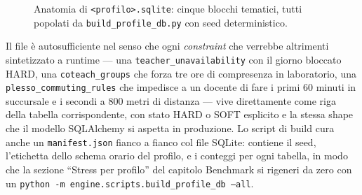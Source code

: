 \begin{figure}[h]
\centering
{}
\caption{Anatomia di \texttt{<profilo>.sqlite}: cinque blocchi
   tematici, tutti popolati da \texttt{build\_profile\_db.py} con
   seed deterministico.}
\label{fig:profilo_sqlite}
\end{figure}

Il file \`e autosufficiente nel senso che ogni \emph{constraint} che
verrebbe altrimenti sintetizzato a runtime --- una \texttt{teacher\_unavailability}
con il giorno bloccato HARD, una \texttt{coteach\_groups} che
forza tre ore di compresenza in laboratorio, una \texttt{plesso\_commuting\_rules}
che impedisce a un docente di fare i primi 60 minuti in succursale
e i secondi a 800 metri di distanza --- vive direttamente come
riga della tabella corrispondente, con stato HARD o SOFT esplicito
e la stessa shape che il modello SQLAlchemy si aspetta in produzione.
Lo script di build cura anche un \texttt{manifest.json} fianco a fianco
col file SQLite: contiene il seed, l'etichetta dello schema orario
del profilo, e i conteggi per ogni tabella, in modo che la sezione
``Stress per profilo'' del capitolo Benchmark si rigeneri da zero
con un \texttt{python -m engine.scripts.build\_profile\_db --all}.

